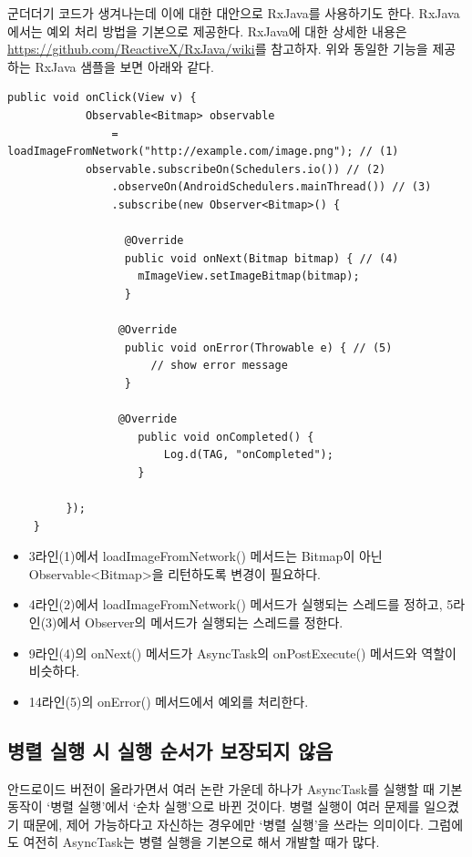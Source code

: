 군더더기 코드가 생겨나는데 이에 대한 대안으로 RxJava를 사용하기도 한다. RxJava에서는 예외 처리 방법을 기본으로 제공한다.
RxJava에 대한 상세한 내용은 \url{https://github.com/ReactiveX/RxJava/wiki}를 참고하자.
위와 동일한 기능을 제공하는 RxJava 샘플을 보면 아래와 같다.
\begin{lstlisting}[frame=single]
	public void onClick(View v) {
    		Observable<Bitmap> observable 
    			= loadImageFromNetwork("http://example.com/image.png"); // (1)
    		observable.subscribeOn(Schedulers.io()) // (2)
        		.observeOn(AndroidSchedulers.mainThread()) // (3)
            	.subscribe(new Observer<Bitmap>() {

	              @Override
	              public void onNext(Bitmap bitmap) { // (4)
	              	mImageView.setImageBitmap(bitmap);
	              }
	              
	             @Override
	              public void onError(Throwable e) { // (5)
	                  // show error message
	              }
	              
	             @Override
                	public void onCompleted() {
                    	Log.d(TAG, "onCompleted");
                	}
                	
		 });
	}
\end{lstlisting}
\begin{itemize}
\item 3라인(1)에서 loadImageFromNetwork() 메서드는 Bitmap이 아닌 Observable<Bitmap>을 리턴하도록 변경이 필요하다.
\item 4라인(2)에서 loadImageFromNetwork() 메서드가 실행되는 스레드를 정하고, 5라인(3)에서 Observer의 메서드가 실행되는 스레드를 정한다.
\item 9라인(4)의 onNext() 메서드가 AsyncTask의 onPostExecute() 메서드와 역할이 비슷하다.
\item 14라인(5)의 onError() 메서드에서 예외를 처리한다.
\end{itemize}

\subsection{병렬 실행 시 실행 순서가 보장되지 않음}
안드로이드 버전이 올라가면서 여러 논란 가운데 하나가 AsyncTask를 실행할 때 기본 동작이 `병렬 실행'에서 `순차 실행'으로 바뀐 것이다. 
병렬 실행이 여러 문제를 일으켰기 때문에, 제어 가능하다고 자신하는 경우에만 `병렬 실행'을 쓰라는 의미이다.
그럼에도 여전히 AsyncTask는 병렬 실행을 기본으로 해서 개발할 때가 많다.\\

